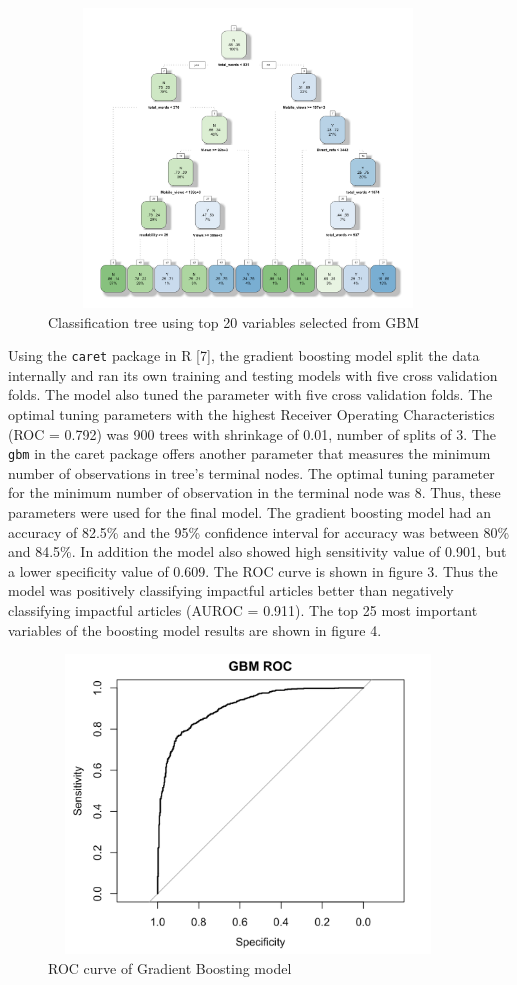\documentclass[10pt,letterpaper]{article}
\begin{document}
\begin{figure}
\includegraphics[width=400px,height=300px]{classification-Tree} \caption{ Classification tree using top 20 variables selected from GBM}\label{fig:unnamed-chunk-2}
\end{figure}

Using the \texttt{caret} package in R {[}7{]}, the gradient boosting
model split the data internally and ran its own training and testing
models with five cross validation folds. The model also tuned the
parameter with five cross validation folds. The optimal tuning
parameters with the highest Receiver Operating Characteristics (ROC =
0.792) was 900 trees with shrinkage of 0.01, number of splits of 3. The
\texttt{gbm} in the caret package offers another parameter that measures
the minimum number of observations in tree's terminal nodes. The optimal
tuning parameter for the minimum number of observation in the terminal
node was 8. Thus, these parameters were used for the final model. The
gradient boosting model had an accuracy of 82.5\% and the 95\%
confidence interval for accuracy was between 80\% and 84.5\%. In
addition the model also showed high sensitivity value of 0.901, but a
lower specificity value of 0.609. The ROC curve is shown in figure 3.
Thus the model was positively classifying impactful articles better than
negatively classifying impactful articles (AUROC = 0.911). The top 25
most important variables of the boosting model results are shown in
figure 4.

\begin{figure}
\includegraphics[width=400px,height=300px]{roc_gbm} \caption{ROC curve of Gradient Boosting model}\label{fig:unnamed-chunk-3}
\end{figure}
\end{document}
